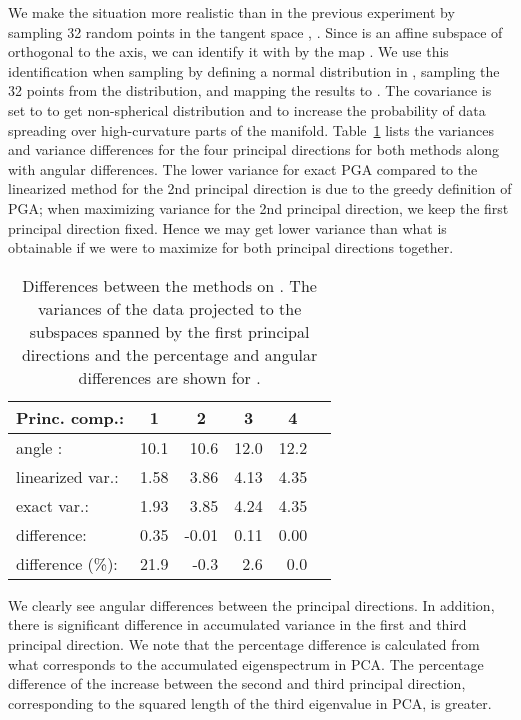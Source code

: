 \documentclass[final]{svjour3}
\begin{document}
We make the situation more realistic than in the previous experiment by 
sampling 32 random points in the tangent space , . Since  is
an affine subspace of  orthogonal to the  axis, we can identify it with
 by the map . We use this
identification when sampling by defining a normal distribution in ,
sampling the 32 points from the distribution, and mapping the results to .
The covariance is set to
 to get non-spherical distribution and to
increase the probability of data spreading over high-curvature parts of the
manifold. Table~\ref{table:low2} lists the variances and variance differences for 
the four principal directions for both methods along with angular differences. 
The lower variance for exact PGA compared to the linearized method for the
2nd principal direction is due to the greedy definition of PGA; when maximizing variance
for the 2nd principal direction, we keep the first principal direction
fixed. Hence we may get lower variance than what is obtainable if we were to maximize
for both principal directions together.
\begin{table}[ht]
\begin{center}
\begin{tabular}{lrrrrr}
  \hline
  \bf{Princ. comp.}: & \multicolumn{1}{c}{\bf{1}} & \multicolumn{1}{c}{\bf{2}} &
  \multicolumn{1}{c}{\bf{3}}& \multicolumn{1}{c}{\bf{4}} \\
  \hline
  angle :     & 10.1 & 10.6 & 12.0 & 12.2 \\
  linearized var.:         & 1.58 & 3.86 & 4.13 & 4.35 \\
  exact var.:           & 1.93 & 3.85 & 4.24 & 4.35 \\
  difference:           & 0.35 & -0.01 & 0.11 & 0.00 \\
  difference (\%):      & 21.9 & -0.3 & 2.6 & 0.0 \\
   \hline
\end{tabular}
\caption{Differences between the methods on . The variances 
of the data projected to the subspaces spanned by the first  principal 
directions and the percentage and angular differences are shown for .}
\label{table:low2}
\end{center}
\end{table}

We clearly see angular differences between the principal directions. In
addition, there is significant difference in accumulated variance in the 
first and third principal
direction. We note that the percentage difference is calculated from 
what corresponds to the accumulated eigenspectrum in PCA. The percentage difference of the increase between the
second and third principal direction, corresponding to the squared length of the third eigenvalue in
PCA, is greater.
\end{document}
